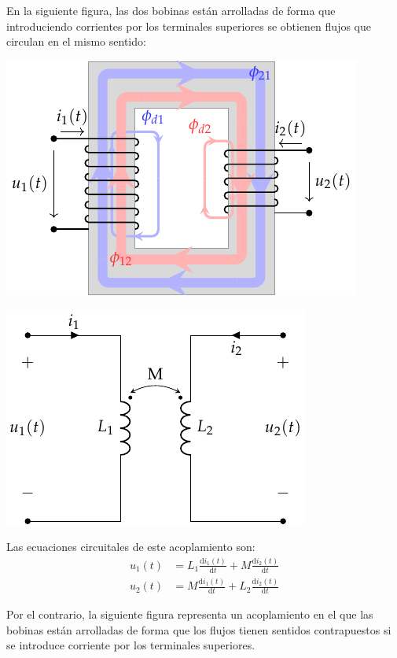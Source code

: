   En la siguiente figura, las dos bobinas están arrolladas de forma
  que introduciendo corrientes por los terminales superiores se
  obtienen flujos que circulan en el mismo sentido:
  \begin{center}
    \includegraphics[height=0.2\textheight]{../figs/acoplamientoTikz.pdf}
  \end{center}

\begin{center}
  \includegraphics[height=0.2\textheight]{../figs/acoplamiento_circuito.pdf}
\end{center}

Las ecuaciones circuitales de este acoplamiento son:
\begin{align*}
  u_1(t) &= L_1 \frac{\mathrm{d}i_1(t)}{\mathrm{d}t} + M \frac{\mathrm{d}i_2(t)}{\mathrm{d}t}\\
  u_2(t) &= M \frac{\mathrm{d}i_1(t)}{\mathrm{d}t} + L_2 \frac{\mathrm{d}i_2(t)}{\mathrm{d}t}
\end{align*}

Por el contrario, la siguiente figura representa un acoplamiento en el
que las bobinas están arrolladas de forma que los flujos tienen
sentidos contrapuestos si se introduce corriente por los terminales
superiores.

